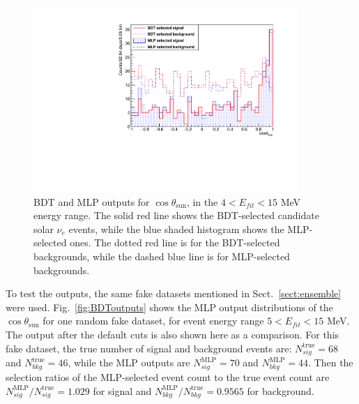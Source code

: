 \begin{figure}[!htb]
	\centering
	\includegraphics[width=10cm]{cosThetaToSun_E4to15_output.pdf}
	\caption[BDT and MLP outputs for the $\cos\theta_\mathrm{sun}$ ($4<E_{fit}<15$ MeV).]{BDT and MLP outputs for $\cos\theta_\mathrm{sun}$, in the $4<E_{fit}<15$ MeV energy range. The solid red line shows the BDT-selected candidate solar $\nu_e$ events, while the blue shaded histogram shows the MLP-selected ones. The dotted red line is for the BDT-selected backgrounds, while the dashed blue line is for MLP-selected backgrounds.\label{fig:cosThetaToSun_4to15_output}}
\end{figure}

To test the outputs, the same fake datasets mentioned in Sect.~\ref{sect:ensemble} were used. Fig.~\ref{fig:BDToutputs} shows the MLP output distributions of the $\cos\theta_\mathrm{sun}$ for one random fake dataset, for event energy range $5<E_{fit}<15$ MeV. The output after the default cuts is also shown here as a comparison. For this fake dataset, the true number of signal and background events are: $N^\mathrm{true}_{sig}=68$ and $N^\mathrm{true}_{bkg}=46$, while the MLP outputs are $N^\mathrm{MLP}_{sig}=70$ and $N^\mathrm{MLP}_{bkg}=44$. Then the selection ratios of the MLP-selected event count to the true event count are $N^\mathrm{MLP}_{sig}/N^\mathrm{true}_{sig}=1.029$  for signal and $N^\mathrm{MLP}_{bkg}/N^\mathrm{true}_{bkg}=0.9565$ for background.


